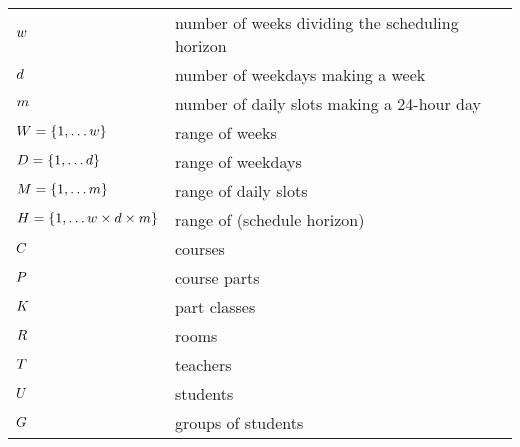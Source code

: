 \begin{table}[!t]
\begin{center}
\begin{tabular}{|l|l|}


\hline
$w$                                 & number of weeks
dividing the scheduling horizon
\\%
$d$                               & number of weekdays
making a week \\
$m$                              &  number of daily slots
making a 24-hour day%
\\
$W =\{1,\ldots w\}$
&  range of weeks 
\\
$D =\{1,\ldots d\}$
&  range of weekdays 
\\
$M =\{1,\ldots m\}$
&  range of daily slots 
\\
$H=\{1,\ldots w\times d\times m\}$
&  range of \timepoints{} (schedule horizon)
\\\hline
$C$%
                                            &  courses
\\
$P$%
                                            &  course parts
\\
$K$%
                                            &  part classes
\\
$R$%
                                            &  rooms
\\
$T$%
                                            &  teachers
\\
$U$%
                                            &  students
\\
$G$%
                                            &  groups of students


\end{tabular}
\end{center}
\end{table}
